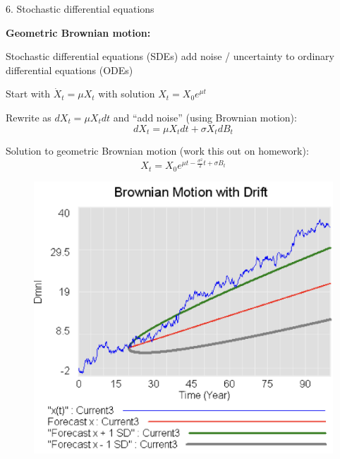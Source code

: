 \documentclass[11pt, aspectratio=169]{beamer}
\newenvironment{witemize}{\itemize\addtolength{\itemsep}{10pt}}{\enditemize}
\begin{document}
\begin{frame}{6. Stochastic differential equations}

\textbf{Geometric Brownian motion:}
\begin{witemize}
\item Stochastic differential equations (SDEs) add noise / uncertainty to ordinary differential equations (ODEs)

\item Start with $\dot X_t = \mu X_t$ with solution $X_t = X_0 e^{\mu t}$

\item Rewrite as $d X_t = \mu X_t dt$ and ``add noise'' (using Brownian motion):
\begin{equation*}
	dX_t = \mu X_t dt + \sigma X_t dB_t
\end{equation*}

\item Solution to geometric Brownian motion (work this out on homework):
\begin{equation*}
	X_t = X_0 e^{\mu t - \frac{\sigma^2}{2} t + \sigma B_t}
\end{equation*}

\end{witemize}
\end{frame}


\begin{frame}{}
	\begin{figure}
		\includegraphics[scale=0.3]{./Brownian6}
	\end{figure}
\end{frame}
\end{document}
